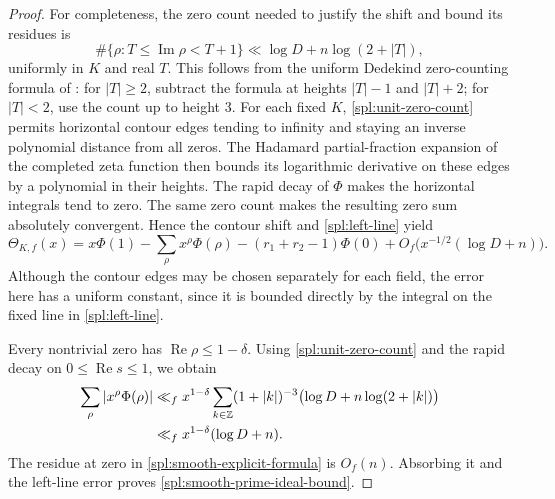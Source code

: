 \begin{proof}
For completeness, the zero count needed to justify the shift and bound
its residues is
\begin{equation}
 \#\{\rho:T\le\operatorname{Im}\rho<T+1\}
 \ll \log D+n\log(2+|T|),
 \label{spl:unit-zero-count}
\end{equation}
uniformly in $K$ and real $T$. This follows from the uniform Dedekind
zero-counting formula of \cite[Corollary~1.2, Equation~(1.3)]{DedekindZeros}:
for $|T|\ge2$, subtract the formula at heights $|T|-1$ and $|T|+2$;
for $|T|<2$, use the count up to height $3$.
For each fixed $K$, \eqref{spl:unit-zero-count} permits horizontal
contour edges tending to infinity and staying an inverse polynomial
distance from all zeros. The Hadamard partial-fraction expansion of
the completed zeta function then bounds its logarithmic derivative on
these edges by a polynomial in their heights. The rapid decay of $\Phi$
makes the horizontal integrals tend to zero. The same zero count makes
the resulting zero sum absolutely convergent. Hence the contour shift
and \eqref{spl:left-line} yield
\begin{equation}
 \Theta_{K,f}(x)
 =x\Phi(1)-\sum_\rho x^\rho\Phi(\rho)
   -(r_1+r_2-1)\Phi(0)
   +O_f\bigl(x^{-1/2}(\log D+n)\bigr).
 \label{spl:smooth-explicit-formula}
\end{equation}
Although the contour edges may be chosen separately for each field,
the error here has a uniform constant, since it is bounded directly by
the integral on the fixed line in \eqref{spl:left-line}.

Every nontrivial zero has $\operatorname{Re}\rho\le1-\delta$.
Using \eqref{spl:unit-zero-count} and the rapid decay on
$0\le\operatorname{Re}s\le1$, we obtain
\begin{align*}
 \sum_\rho|x^\rho\Phi(\rho)|
 &\ll_f x^{1-\delta}
    \sum_{k\in\mathbb{Z}}(1+|k|)^{-3}
       \bigl(\log D+n\log(2+|k|)\bigr)\\
 &\ll_f x^{1-\delta}(\log D+n).
\end{align*}
The residue at zero in \eqref{spl:smooth-explicit-formula} is $O_f(n)$.
Absorbing it and the left-line error proves
\eqref{spl:smooth-prime-ideal-bound}.
\end{proof}

